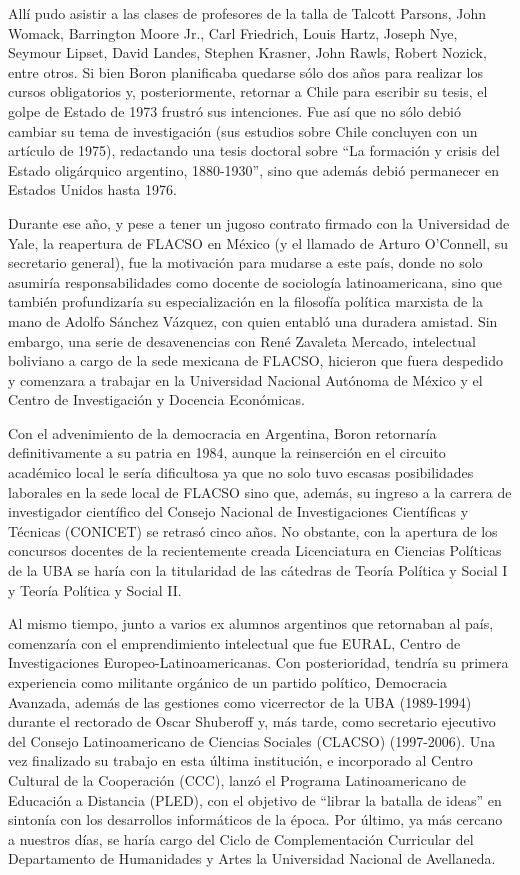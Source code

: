 Allí pudo asistir a las clases de profesores de la talla de Talcott Parsons, John Womack, Barrington Moore Jr., Carl Friedrich, Louis Hartz, Joseph Nye, Seymour Lipset, David Landes, Stephen Krasner, John Rawls, Robert Nozick, entre otros. Si bien Boron planificaba quedarse sólo dos años para realizar los cursos obligatorios y, posteriormente, retornar a Chile para escribir su tesis, el golpe de Estado de 1973 frustró sus intenciones. Fue así que no sólo debió cambiar su tema de investigación (sus estudios sobre Chile concluyen con un artículo de 1975), redactando una tesis doctoral sobre ``La formación y crisis del Estado oligárquico argentino, 1880-1930'', sino que además debió permanecer en Estados Unidos hasta 1976.

Durante ese año, y pese a tener un jugoso contrato firmado con la Universidad de Yale, la reapertura de FLACSO en México (y el llamado de Arturo O'Connell, su secretario general), fue la motivación para mudarse a este país, donde no solo asumiría responsabilidades como docente de sociología latinoamericana, sino que también profundizaría su especialización en la filosofía política marxista de la mano de Adolfo Sánchez Vázquez, con quien entabló una duradera amistad. Sin embargo, una serie de desavenencias con René Zavaleta Mercado, intelectual boliviano a cargo de la sede mexicana de FLACSO, hicieron que fuera despedido y comenzara a trabajar en la Universidad Nacional Autónoma de México y el Centro de Investigación y Docencia Económicas.

Con el advenimiento de la democracia en Argentina, Boron retornaría definitivamente a su patria en 1984, aunque la reinserción en el circuito académico local le sería dificultosa ya que no solo tuvo escasas posibilidades laborales en la sede local de FLACSO sino que, además, su ingreso a la carrera de investigador científico del Consejo Nacional de Investigaciones Científicas y Técnicas (CONICET) se retrasó cinco años. No obstante, con la apertura de los concursos docentes de la recientemente creada Licenciatura en Ciencias Políticas de la UBA se haría con la titularidad de las cátedras de Teoría Política y Social I y Teoría Política y Social II.

Al mismo tiempo, junto a varios ex alumnos argentinos que retornaban al país, comenzaría con el emprendimiento intelectual que fue EURAL, Centro de Investigaciones Europeo-Latinoamericanas. Con posterioridad, tendría su primera experiencia como militante orgánico de un partido político, Democracia Avanzada, además de las gestiones como vicerrector de la UBA (1989-1994) durante el rectorado de Oscar Shuberoff y, más tarde, como secretario ejecutivo del Consejo Latinoamericano de Ciencias Sociales (CLACSO) (1997-2006). Una vez finalizado su trabajo en esta última institución, e incorporado al Centro Cultural de la Cooperación (CCC), lanzó el Programa Latinoamericano de Educación a Distancia (PLED), con el objetivo de ``librar la batalla de ideas'' en sintonía con los desarrollos informáticos de la época. Por último, ya más cercano a nuestros días, se haría cargo del Ciclo de Complementación Curricular del Departamento de Humanidades y Artes la Universidad Nacional de Avellaneda.

